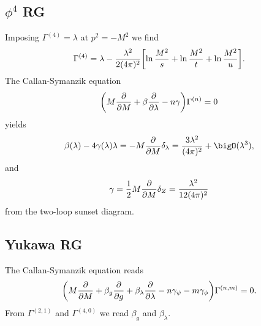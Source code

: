 \documentclass{article}
\begin{document}
\subsection{\texorpdfstring{$\phi^4$}{phi4} RG}

Imposing $\Gamma^{(4)} = \lambda$ at $p^2 = -M^2$ we find
\[ \Gamma^{(4)} = \lambda - \frac{\lambda^2}{2(4\pi)^2}\qty[\ln \frac{M^2}{s} + \ln \frac{M^2}{t} + \ln \frac{M^2}{u}]. \]
The Callan-Symanzik equation
\[ \qty(M \pdv{M} + \beta \pdv{\lambda} - n\gamma)\Gamma^{(n)} = 0 \]
yields
\[ \beta(\lambda) - 4\gamma(\lambda)\lambda = -M \pdv{M}\delta_\lambda = \frac{3\lambda^2}{(4\pi)^2} + \bigO(\lambda^3), \]
and
\[ \gamma = \frac{1}{2} M \pdv{M} \delta_Z = \frac{\lambda^2}{12(4\pi)^2} \]
from the two-loop sunset diagram.

\subsection{Yukawa RG}

The Callan-Symanzik equation reads
\[ \qty(M\pdv{M} + \beta_g \pdv{g} + \beta_\lambda \pdv{\lambda} - n\gamma_\psi - m\gamma_\phi) \Gamma^{(n,m)} = 0. \]
From $\Gamma^{(2,1)}$ and $\Gamma^{(4,0)}$ we read $\beta_g$ and $\beta_\lambda$.

% 
% 
\end{document}
